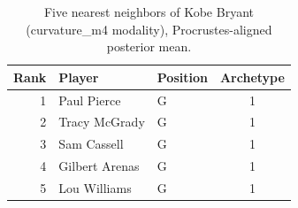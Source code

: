\begin{table}[htbp]
  \centering\small
  \begin{tabular}{rllc}
    \toprule
    Rank & Player & Position & Archetype \\
    \midrule
    1 & Paul Pierce & G & 1 \\
    2 & Tracy McGrady & G & 1 \\
    3 & Sam Cassell & G & 1 \\
    4 & Gilbert Arenas & G & 1 \\
    5 & Lou Williams & G & 1 \\
    \bottomrule
  \end{tabular}
  \caption{Five nearest neighbors of Kobe Bryant (curvature_m4 modality), Procrustes-aligned posterior mean.}
  \label{tab:Kobe_Bryant_neighbors_curvature_m4}
\end{table}

